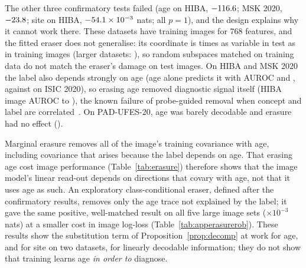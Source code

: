 \documentclass[conference]{IEEEtran}
\begin{document}
The other three confirmatory tests failed (age on HIBA, $-116.6$; MSK 2020, $-23.8$; site on HIBA, $-54.1\times10^{-3}$ nats; all $p=1$), and the design explains why it cannot work there. These datasets have \ERAntrain{} training images for 768 features, and the fitted eraser does not generalise: its coordinate is \ERAsdSmall{} times as variable in test as in training images (larger datasets: \ERAsdLarge{}), so random subspaces matched on training data do not match the eraser's damage on test images. On HIBA and MSK 2020 the label also depends strongly on age (age alone predicts it with AUROC \AGEaucHiba{} and \AGEaucMsk{}, against \AGEaucIsic{} on ISIC 2020), so erasing age removed diagnostic signal itself (HIBA image AUROC \ERAhibaAUCzero{} to \ERAhibaAUCone{}), the known failure of probe-guided removal when concept and label are correlated~\cite{kumar2022probing}. On PAD-UFES-20, age was barely decodable and erasure had no effect (\ERAPad{}).

Marginal erasure removes all of the image's training covariance with age, including covariance that arises because the label depends on age. That erasing age cost image performance (Table~\ref{tab:erasure}) therefore shows that the image model's linear read-out depends on directions that covary with age, not that it uses age as such. An exploratory class-conditional eraser, defined after the confirmatory results, removes only the age trace not explained by the label; it gave the same positive, well-matched result on all five large image sets (\ERAcond{}$\times10^{-3}$ nats) at a \ERAcondCost{} smaller cost in image log-loss (Table~\ref{tab:apperasurerob}). These results show the substitution term of Proposition~\ref{prop:decomp} at work for age, and for site on two datasets, for linearly decodable information; they do not show that training learns age \emph{in order to} diagnose.
\end{document}
